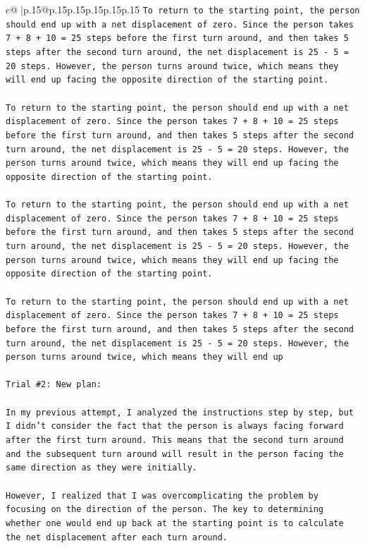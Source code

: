 \documentclass{article}
\begin{document}
{\begin{supertabular}{c@{$\;$}|p{.15\linewidth}@{}p{.15\linewidth}p{.15\linewidth}p{.15\linewidth}p{.15\linewidth}p{.15\linewidth}}
{{{\texttt{To return to the starting point, the person should end up with a net displacement of zero. Since the person takes 7 + 8 + 10 = 25 steps before the first turn around, and then takes 5 steps after the second turn around, the net displacement is 25 {-} 5 = 20 steps. However, the person turns around twice, which means they will end up facing the opposite direction of the starting point. } \\
\\ 
\texttt{To return to the starting point, the person should end up with a net displacement of zero. Since the person takes 7 + 8 + 10 = 25 steps before the first turn around, and then takes 5 steps after the second turn around, the net displacement is 25 {-} 5 = 20 steps. However, the person turns around twice, which means they will end up facing the opposite direction of the starting point. } \\
\\ 
\texttt{To return to the starting point, the person should end up with a net displacement of zero. Since the person takes 7 + 8 + 10 = 25 steps before the first turn around, and then takes 5 steps after the second turn around, the net displacement is 25 {-} 5 = 20 steps. However, the person turns around twice, which means they will end up facing the opposite direction of the starting point. } \\
\\ 
\texttt{To return to the starting point, the person should end up with a net displacement of zero. Since the person takes 7 + 8 + 10 = 25 steps before the first turn around, and then takes 5 steps after the second turn around, the net displacement is 25 {-} 5 = 20 steps. However, the person turns around twice, which means they will end up} \\
\\ 
\texttt{Trial \#2: New plan: } \\
\\ 
\texttt{In my previous attempt, I analyzed the instructions step by step, but I didn't consider the fact that the person is always facing forward after the first turn around. This means that the second turn around and the subsequent turn around will result in the person facing the same direction as they were initially. } \\
\\ 
\texttt{However, I realized that I was overcomplicating the problem by focusing on the direction of the person. The key to determining whether one would end up back at the starting point is to calculate the net displacement after each turn around. } \\
}}}
\end{supertabular}}
\end{document}
